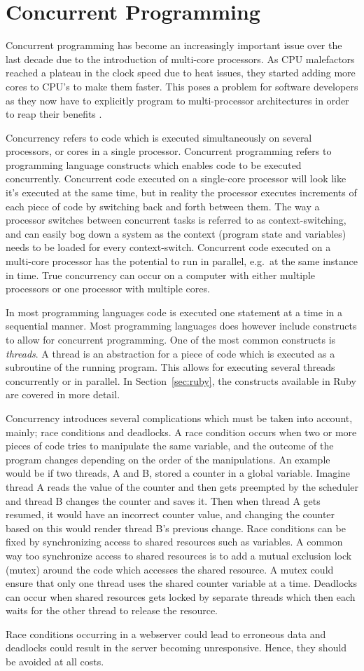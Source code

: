 \section{Concurrent Programming} %
\label{sec:concurrent}
Concurrent programming has become an increasingly important issue over the
last decade due to the introduction of multi-core processors. As CPU
malefactors reached a plateau in the clock speed due to heat issues, they
started adding more cores to CPU's to make them faster. This poses a problem
for software developers as they now have to explicitly program to
multi-processor architectures in order to reap their benefits \cite{fund}.

Concurrency refers to code which is executed simultaneously on several
processors, or cores in a single processor. Concurrent programming refers to
programming language constructs which enables code to be executed concurrently.
Concurrent code executed on a single-core processor will look like it's executed
at the same time, but in reality the processor executes increments of each piece
of code by switching back and forth between them. The way a processor switches
between concurrent tasks is referred to as context-switching, and can easily bog
down a system as the context (program state and variables) needs to be loaded
for every context-switch. Concurrent code executed on a multi-core processor
has the potential to run in parallel, e.g.\ at the same instance in
time. True concurrency can occur on a computer with either multiple processors
or one processor with multiple cores.

In most programming languages code is executed one statement at a time in a
sequential manner. Most programming languages does however include constructs
to allow for concurrent programming.  One of the most common constructs is
\textit{threads}. A thread is an abstraction for a piece of code which is
executed as a subroutine of the running program. This allows for executing
several threads concurrently or in parallel.  In
Section~\ref{sec:ruby}, the constructs available in Ruby are covered in more
detail.

Concurrency introduces several complications which must be taken into account,
mainly; race conditions and deadlocks. A race condition occurs when two or more
pieces of code tries to manipulate the same variable, and the outcome of the
program changes depending on the order of the manipulations. An example would be
if two threads, A and B, stored a counter in a global variable. Imagine thread A 
reads the value of the counter and then gets preempted by the scheduler and thread B changes
the counter and saves it. Then when thread A gets resumed, it would have an
incorrect counter value, and changing the counter based on this would render
thread B's previous change. Race conditions can be fixed by synchronizing access
to shared resources such as variables. A common way too synchronize access to
shared resources is to add a mutual exclusion lock (mutex) around the code which
accesses the shared resource. A mutex could ensure that only one thread uses the
shared counter variable at a time. Deadlocks can occur when shared resources gets
locked by separate threads which then each waits for the other thread to
release the resource.

Race conditions occurring in a webserver could lead to erroneous data and
deadlocks could result in the server becoming unresponsive. Hence, they should
be avoided at all costs.
